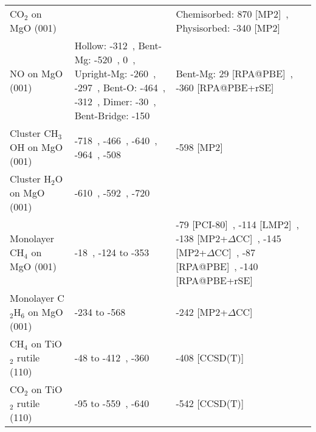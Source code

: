 \begin{table}
\begin{adjustbox}{center}
\begin{tabular}{lp{7cm}p{7cm}}
CO$_2$ on MgO (001) &  & Chemisorbed: 870 [MP2]~\cite{pacchioniInitioClusterModel1994b}, Physisorbed: -340 [MP2]~\cite{pacchioniPhysisorbedChemisorbedCO21993a} \\
NO on MgO (001) & Hollow: -312~\cite{songRemarkablyStrongChemisorption2017a}, Bent-Mg: -520~\cite{yanagisawaThreeTypesAdsorptions1999b}, 0~\cite{divalentinNOMonomersMgO2002a}, Upright-Mg: -260~\cite{rodriguezStudiesBehaviorMixedmetal2001d}, -297~\cite{anezNONO2Adsorption2017a}, Bent-O: -464~\cite{mileticFirstPrinciplesCharacterizationNOx2003a}, -312~\cite{schneiderDramaticCooperativeEffects2002a,schneiderQualitativeDifferencesAdsorption2004a}, Dimer: -30~\cite{luAdsorptionDecompositionNO1999b}, Bent-Bridge: -150~\cite{limDensityFunctionalTheory2019} & Bent-Mg: 29 [RPA@PBE]~\cite{bajdichSurfaceEnergeticsAlkalineearth2015b}, -360 [RPA@PBE+rSE]~\cite{bajdichSurfaceEnergeticsAlkalineearth2015b} \\
Cluster CH$_3$OH on MgO (001) & -718~\cite{rodriguezAdsorptionMethanolMolecules2007b}, -466~\cite{gayDensityFunctionalStudy2005a}, -640~\cite{manTheoreticalAspectsMethyl2017}, -964~\cite{sainnaCombinedPeriodicDFT2021a}, -508~\cite{petitjeanQuantitativeInvestigationMgO2010a} & -598 [MP2]~\cite{brandaTheoreticalStudyCharge2002b} \\
Cluster H$_2$O on MgO (001) & -610~\cite{huProtonTransferAdsorbed2010a}, -592~\cite{alvimDensityFunctionalTheorySimulation2012}, -720~\cite{dingHydrationStructureFlat2021} &  \\
Monolayer CH$_4$ on MgO (001) & -18~\cite{drummondDensityFunctionalInvestigation2006a,stimacSimulatingCH4Physisorption2008}, -124 to -353~\cite{r.rehakIncludingDispersionDensity2020} & -79 [PCI-80]~\cite{todnemMolecularAdsorptionMethane1999a}, -114 [LMP2]~\cite{pisaniPeriodicLocalMP22008b}, -138 [MP2+$\Delta$CC]~\cite{tosoniAccurateQuantumChemical2010}, -145 [MP2+$\Delta$CC]~\cite{alessioChemicallyAccurateAdsorption2018}, -87 [RPA@PBE]~\cite{bajdichSurfaceEnergeticsAlkalineearth2015b}, -140 [RPA@PBE+rSE]~\cite{bajdichSurfaceEnergeticsAlkalineearth2015b} \\
Monolayer C$_2$H$_6$ on MgO (001) & -234 to -568~\cite{r.rehakIncludingDispersionDensity2020} & -242 [MP2+$\Delta$CC]~\cite{alessioChemicallyAccurateAdsorption2018} \\
CH$_4$ on TiO$_2$ rutile (110) & -48 to -412~\cite{kubasSurfaceAdsorptionEnergetics2016c}, -360~\cite{tillotsonAdsorptionOrganicMolecules2015} & -408 [CCSD(T)]~\cite{kubasSurfaceAdsorptionEnergetics2016c} \\
CO$_2$ on TiO$_2$ rutile (110) & -95 to -559~\cite{kubasSurfaceAdsorptionEnergetics2016c}, -640~\cite{kovacicElectronicPropertiesRutile2022} & -542 [CCSD(T)]~\cite{kubasSurfaceAdsorptionEnergetics2016c} \\

\end{tabular}
\end{adjustbox}
\end{table}
